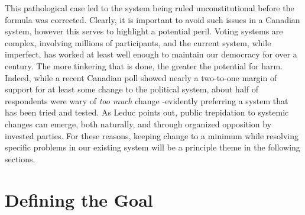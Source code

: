 This pathological case led to the system being ruled unconstitutional before the formula was corrected.
Clearly, it is important to avoid such issues in a Canadian system, however this serves to highlight a potential peril.
Voting systems are complex, involving millions of participants, and the current system, while imperfect, has worked at least well enough to maintain our democracy for over a century.
The more tinkering that is done, the greater the potential for harm.
Indeed, while a recent Canadian poll\cite{Broadbent_poll} showed nearly a two-to-one margin of support for at least some change to the political system, about half of respondents were wary of \emph{too much} change \--evidently preferring a system that has been tried and tested.
As Leduc points out\cite{Leduc}, public trepidation to systemic changes can emerge, both naturally, and through organized opposition by invested parties.
For these reasons, keeping change to a minimum while resolving specific problems in our existing system will be a principle theme in the following sections.


\section{Defining the Goal}
\label{sec:goal_list}

